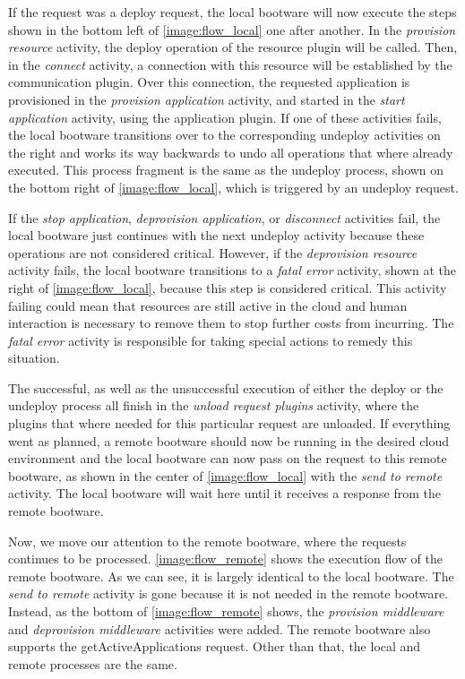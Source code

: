 If the request was a deploy request, the local bootware will now execute the steps shown in the bottom left of \autoref{image:flow_local} one after another.
In the \textit{provision resource} activity, the deploy operation of the resource plugin will be called.
Then, in the \textit{connect} activity, a connection with this resource will be established by the communication plugin.
Over this connection, the requested application is provisioned in the \textit{provision application} activity, and started in the \textit{start application} activity, using the application plugin.
If one of these activities fails, the local bootware transitions over to the corresponding undeploy activities on the right and works its way backwards to undo all operations that where already executed.
This process fragment is the same as the undeploy process, shown on the bottom right of \autoref{image:flow_local}, which is triggered by an undeploy request.

If the \textit{stop application}, \textit{deprovision application}, or \textit{disconnect} activities fail, the local bootware just continues with the next undeploy activity because these operations are not considered critical.
However, if the \textit{deprovision resource} activity fails, the local bootware transitions to a \textit{fatal error} activity, shown at the right of \autoref{image:flow_local}, because this step is considered critical.
This activity failing could mean that resources are still active in the cloud and human interaction is necessary to remove them to stop further costs from incurring.
The \textit{fatal error} activity is responsible for taking special actions to remedy this situation.

The successful, as well as the unsuccessful execution of either the deploy or the undeploy process all finish in the \textit{unload request plugins} activity, where the plugins that where needed for this particular request are unloaded.
If everything went as planned, a remote bootware should now be running in the desired cloud environment and the local bootware can now pass on the request to this remote bootware, as shown in the center of \autoref{image:flow_local} with the \textit{send to remote} activity.
The local bootware will wait here until it receives a response from the remote bootware.

Now, we move our attention to the remote bootware, where the requests continues to be processed.
\autoref{image:flow_remote} shows the execution flow of the remote bootware.
As we can see, it is largely identical to the local bootware.
The \textit{send to remote} activity is gone because it is not needed in the remote bootware.
Instead, as the bottom of \autoref{image:flow_remote} shows, the \textit{provision middleware} and \textit{deprovision middleware} activities were added.
The remote bootware also supports the getActiveApplications request.
Other than that, the local and remote processes are the same.


